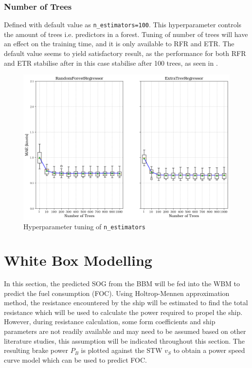 \subsubsection*{Number of Trees}\label{sec:n_estimators}

Defined with default value as {\tt n\_estimators=100}. This hyperparameter controls the amount of trees i.e. predictors in a forest. Tuning of number of trees will have an effect on the training time, and it is only available to RFR and ETR. The default value seems to yield satisfactory result, as the performance for both RFR and ETR stabilise after in this case stabilise after 100 trees, as seen in . 

\begin{figure}[h]
    \centering
        \includegraphics[width=.65\textwidth]{02_figures/hpo_n_estimators_mae.png}
        \caption{Hyperparameter tuning of {\tt n\_estimators}}
        \label{fig:n_estimators}
\end{figure}



\section{White Box Modelling}\label{sec:WBM_modelling}

In this section, the predicted SOG from the BBM will be fed into the WBM to predict the fuel consumption (FOC). Using Holtrop-Mennen approximation method, the resistance encountered by the ship will be estimated to find the total resistance which will be used to calculate the power required to propel the ship. However, during resistance calculation, some form coefficients and ship parameters are not readily available and may need to be assumed based on other literature studies, this assumption will be indicated throughout this section. The resulting brake power $P_B$ is plotted against the STW $v_S$ to obtain a power speed curve model which can be used to predict FOC. 

